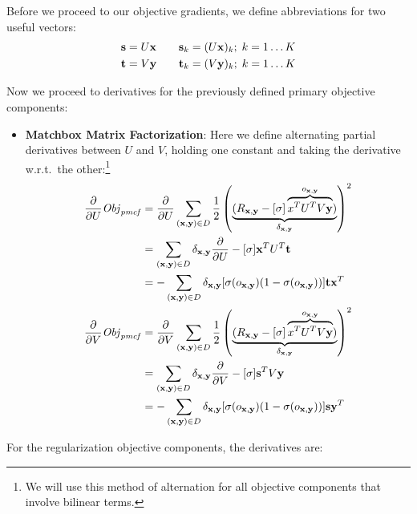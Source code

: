 Before we proceed to our objective gradients, we define abbreviations
for two useful vectors:
\begin{align*}
\mathbf{s} & = U \mathbf{x} \qquad \mathbf{s}_{k} = (U \mathbf{x})_{k}; \; k=1\ldots K\\
\mathbf{t} & = V \mathbf{y} \qquad \mathbf{t}_{k} = (V \mathbf{y})_{k}; \; k=1\ldots K
\end{align*}

Now we proceed to derivatives for the previously defined primary
objective components:
\begin{itemize}
\item {\bf Matchbox Matrix Factorization}:
Here we define alternating partial derivatives between $U$ and $V$, holding one
constant and taking the derivative w.r.t.\ the other:\footnote{We will use
this method of alternation for all objective components that involve bilinear
terms.}
\begin{align*}
\frac{\partial}{\partial U} \mathit{Obj}_{\mathit{pmcf}} & = \frac{\partial}{\partial U} \sum_{(\mathbf{x},\mathbf{y}) \in D} \frac{1}{2} \left( \underbrace{(R_{\mathbf{x},\mathbf{y}} - [\sigma] \overbrace{x^T U^T V\mathbf{y}}^{o_{\mathbf{x},\mathbf{y}}})}_{\delta_{\mathbf{x},\mathbf{y}}} \right)^2\\
& = \sum_{(\mathbf{x},\mathbf{y}) \in D} \delta_{\mathbf{x},\mathbf{y}} \frac{\partial}{\partial U} - [\sigma] \mathbf{x}^T U^T \mathbf{t} \\
& = - \sum_{(\mathbf{x},\mathbf{y}) \in D} \delta_{\mathbf{x},\mathbf{y}} [\sigma(o_{\mathbf{x},\mathbf{y}}) (1 - \sigma(o_{\mathbf{x},\mathbf{y}}))] \mathbf{t} \mathbf{x}^T \\
\frac{\partial}{\partial V} \mathit{Obj}_{\mathit{pmcf}} & = \frac{\partial}{\partial V} \sum_{(\mathbf{x},\mathbf{y}) \in D} \frac{1}{2} \left( \underbrace{(R_{\mathbf{x},\mathbf{y}} - [\sigma] \overbrace{x^T U^T V\mathbf{y}}^{o_{\mathbf{x},\mathbf{y}}})}_{\delta_{\mathbf{x},\mathbf{y}}} \right)^2\\
& = \sum_{(\mathbf{x},\mathbf{y}) \in D} \delta_{\mathbf{x},\mathbf{y}} \frac{\partial}{\partial V} - [\sigma] \mathbf{s}^T V \mathbf{y} \\
& = - \sum_{(\mathbf{x},\mathbf{y}) \in D} \delta_{\mathbf{x},\mathbf{y}} [\sigma(o_{\mathbf{x},\mathbf{y}}) (1 - \sigma(o_{\mathbf{x},\mathbf{y}}))] \mathbf{s} \mathbf{y}^T
\end{align*}
\end{itemize}

For the regularization objective components, the derivatives are:

